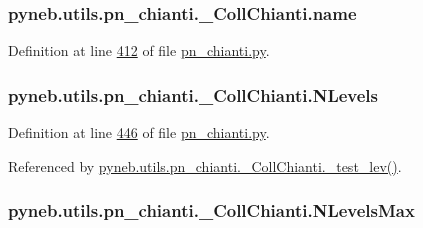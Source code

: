 \subsubsection[{name}]{\setlength{\rightskip}{0pt plus 5cm}pyneb.\+utils.\+pn\+\_\+chianti.\+\_\+\+Coll\+Chianti.\+name}\label{classpyneb_1_1utils_1_1pn__chianti_1_1___coll_chianti_ac2de9885177db13b72b7f9a937cc3544}


Definition at line \hyperlink{pn__chianti_8py_source_l00412}{412} of file \hyperlink{pn__chianti_8py_source}{pn\+\_\+chianti.\+py}.

\hypertarget{classpyneb_1_1utils_1_1pn__chianti_1_1___coll_chianti_a453595ef60eae9d063e2a24ef43002f5}{}
\subsubsection[{N\+Levels}]{\setlength{\rightskip}{0pt plus 5cm}pyneb.\+utils.\+pn\+\_\+chianti.\+\_\+\+Coll\+Chianti.\+N\+Levels}\label{classpyneb_1_1utils_1_1pn__chianti_1_1___coll_chianti_a453595ef60eae9d063e2a24ef43002f5}


Definition at line \hyperlink{pn__chianti_8py_source_l00446}{446} of file \hyperlink{pn__chianti_8py_source}{pn\+\_\+chianti.\+py}.



Referenced by \hyperlink{pn__chianti_8py_source_l00449}{pyneb.\+utils.\+pn\+\_\+chianti.\+\_\+\+Coll\+Chianti.\+\_\+test\+\_\+lev()}.

\hypertarget{classpyneb_1_1utils_1_1pn__chianti_1_1___coll_chianti_aa3eaa6c3196c09e49430e4aedeea9fe1}{}
\subsubsection[{N\+Levels\+Max}]{\setlength{\rightskip}{0pt plus 5cm}pyneb.\+utils.\+pn\+\_\+chianti.\+\_\+\+Coll\+Chianti.\+N\+Levels\+Max}\label{classpyneb_1_1utils_1_1pn__chianti_1_1___coll_chianti_aa3eaa6c3196c09e49430e4aedeea9fe1}


